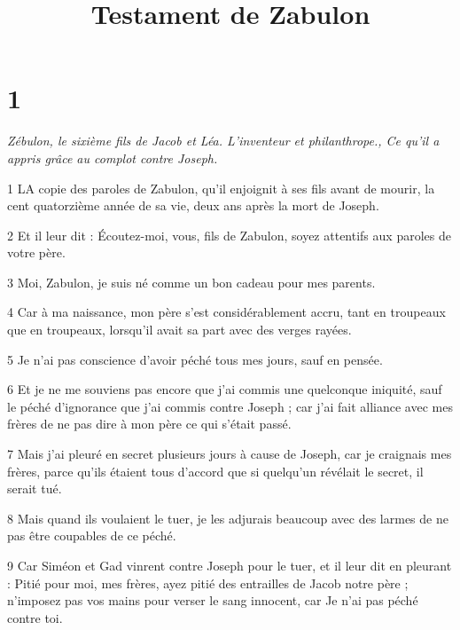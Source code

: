 

\title{Testament de Zabulon}

\chapter{1}

\par \textit{Zébulon, le sixième fils de Jacob et Léa. L'inventeur et philanthrope., Ce qu'il a appris grâce au complot contre Joseph.}

\par 1 LA copie des paroles de Zabulon, qu'il enjoignit à ses fils avant de mourir, la cent quatorzième année de sa vie, deux ans après la mort de Joseph.

\par 2 Et il leur dit : Écoutez-moi, vous, fils de Zabulon, soyez attentifs aux paroles de votre père.

\par 3 Moi, Zabulon, je suis né comme un bon cadeau pour mes parents.

\par 4 Car à ma naissance, mon père s'est considérablement accru, tant en troupeaux que en troupeaux, lorsqu'il avait sa part avec des verges rayées.

\par 5 Je n'ai pas conscience d'avoir péché tous mes jours, sauf en pensée.

\par 6 Et je ne me souviens pas encore que j'ai commis une quelconque iniquité, sauf le péché d'ignorance que j'ai commis contre Joseph ; car j'ai fait alliance avec mes frères de ne pas dire à mon père ce qui s'était passé.

\par 7 Mais j'ai pleuré en secret plusieurs jours à cause de Joseph, car je craignais mes frères, parce qu'ils étaient tous d'accord que si quelqu'un révélait le secret, il serait tué.

\par 8 Mais quand ils voulaient le tuer, je les adjurais beaucoup avec des larmes de ne pas être coupables de ce péché.

\par 9 Car Siméon et Gad vinrent contre Joseph pour le tuer, et il leur dit en pleurant : Pitié pour moi, mes frères, ayez pitié des entrailles de Jacob notre père ; n'imposez pas vos mains pour verser le sang innocent, car Je n'ai pas péché contre toi.


